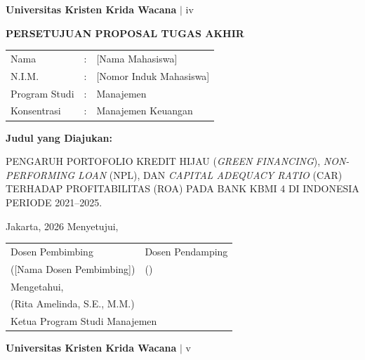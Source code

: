 \documentclass[12pt,a4paper]{article}
\newcommand{\ukrida}{Universitas Kristen Krida Wacana}
\newcommand{\prodi}{Manajemen}
\newcommand{\nahamahasiswa}{[Nama Mahasiswa]}
\newcommand{\nim}{[Nomor Induk Mahasiswa]}
\newcommand{\dosbim}{[Nama Dosen Pembimbing]}
\newcommand{\ketprodi}{Rita Amelinda, S.E., M.M.}
\numberwithin{equation}{section}
\begin{document}
\vfill
\begin{flushright}
  \footnotesize\textbf{\ukrida} $|$ iv
\end{flushright}

\newpage
\thispagestyle{frontmatter}
\begin{center}
  {\large\bfseries PERSETUJUAN PROPOSAL TUGAS AKHIR}
\end{center}

\vspace{0.8cm}
\noindent
\begin{tabular}{lll}
  Nama          & : & \nahamahasiswa \\
  N.I.M.        & : & \nim \\
  Program Studi & : & \prodi \\
  Konsentrasi   & : & Manajemen Keuangan \\
\end{tabular}

\vspace{0.5cm}
\noindent \textbf{Judul yang Diajukan:}

\vspace{0.3cm}
\noindent PENGARUH PORTOFOLIO KREDIT HIJAU (\emph{GREEN FINANCING}),
\emph{NON-PERFORMING LOAN} (NPL), DAN \emph{CAPITAL ADEQUACY RATIO} (CAR)
TERHADAP PROFITABILITAS (ROA) PADA BANK KBMI 4 DI INDONESIA PERIODE 2021--2025.

\vspace{1cm}
\noindent Jakarta, \underline{\hspace{3cm}} 2026 \hfill Menyetujui,

\vspace{0.5cm}
\noindent
\begin{tabular}{p{6cm} p{6cm}}
  Dosen Pembimbing & Dosen Pendamping \\[2.5cm]
  (\dosbim) & (\underline{\hspace{4cm}}) \\[0.8cm]
  \multicolumn{2}{l}{Mengetahui,} \\[0.4cm]
  \multicolumn{2}{l}{(\ketprodi)} \\
  \multicolumn{2}{l}{Ketua Program Studi Manajemen} \\
\end{tabular}

\vfill
\begin{flushright}
  \footnotesize\textbf{\ukrida} $|$ v
\end{flushright}
\end{document}
